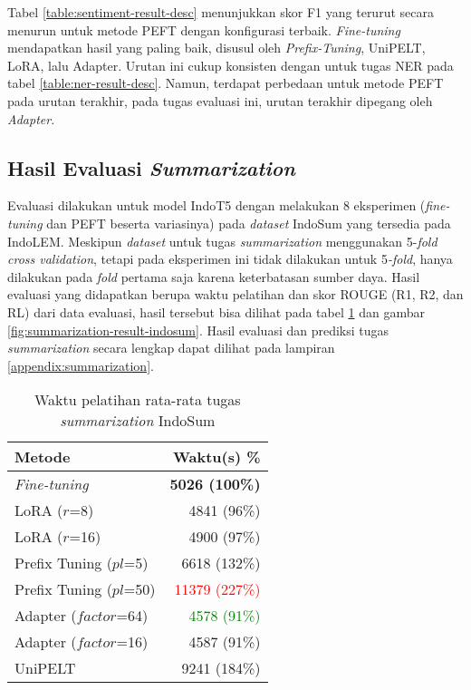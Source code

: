 Tabel \ref{table:sentiment-result-desc} menunjukkan skor F1 yang terurut secara menurun untuk metode PEFT dengan konfigurasi terbaik. \textit{Fine-tuning} mendapatkan hasil yang paling baik, disusul oleh \textit{Prefix-Tuning}, UniPELT, LoRA, lalu Adapter. Urutan ini cukup konsisten dengan untuk tugas NER pada tabel \ref{table:ner-result-desc}. Namun, terdapat perbedaan untuk metode PEFT pada urutan terakhir, pada tugas evaluasi ini, urutan terakhir dipegang oleh \textit{Adapter}.

\subsection{Hasil Evaluasi \textit{Summarization}}

Evaluasi dilakukan untuk model IndoT5 dengan melakukan 8 eksperimen (\textit{fine-tuning} dan PEFT beserta variasinya) pada \textit{dataset} IndoSum yang tersedia pada IndoLEM. Meskipun \textit{dataset} untuk tugas \textit{summarization} menggunakan 5-\textit{fold cross validation}, tetapi pada eksperimen ini tidak dilakukan untuk 5\textit{-fold}, hanya dilakukan pada \textit{fold} pertama saja karena keterbatasan sumber daya. Hasil evaluasi yang didapatkan berupa waktu pelatihan dan skor ROUGE (R1, R2, dan RL) dari data evaluasi, hasil tersebut bisa dilihat pada tabel \ref{table:runtime-summarization-indosum} dan gambar \ref{fig:summarization-result-indosum}. Hasil evaluasi dan prediksi tugas \textit{summarization} secara lengkap dapat dilihat pada lampiran \ref{appendix:summarization}.

\begin{table}[h]
    \centering
    \caption{Waktu pelatihan rata-rata tugas \textit{summarization} IndoSum}
    \label{table:runtime-summarization-indosum}
    \begin{tabular}{l|r}
        \toprule
        \textbf{Metode} & \textbf{Waktu(s) \%} \\
        \midrule
        \textit{Fine-tuning} & \textbf{5026 (100\%)} \\
        LoRA ($r$=8) & 4841 (96\%) \\
        LoRA ($r$=16) & 4900 (97\%) \\
        Prefix Tuning ($pl$=5) & 6618 (132\%) \\
        Prefix Tuning ($pl$=50) & \textcolor{Red}{11379 (227\%)} \\
        Adapter ($factor$=64) & \textcolor{Green}{4578 (91\%)} \\
        Adapter ($factor$=16) & 4587 (91\%) \\
        UniPELT & 9241 (184\%) \\
        \bottomrule
    \end{tabular}
\end{table}

